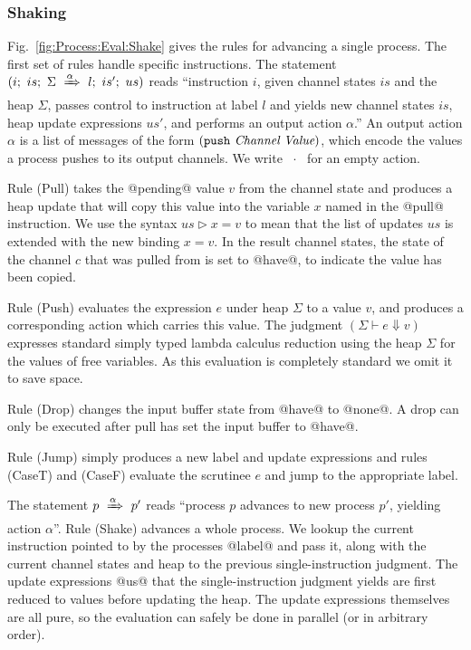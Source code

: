 



\subsubsection{Shaking}
Fig.~\ref{fig:Process:Eval:Shake} gives the rules for advancing a single process. The first set of rules handle specific instructions. The statement $(i;~is;~\Sigma~\xRightarrow{\alpha}~l;~is';~us)$ reads ``instruction $i$, given channel states $is$ and the heap $\Sigma$, passes control to instruction at label $l$ and yields new channel states $is$, heap update expressions $us'$, and performs an output action $\alpha$.'' An output action $\alpha$ is a list of messages of the form $(\texttt{push}~\textit{Channel}~\textit{Value})$, which encode the values a process pushes to its output channels. We write ~$\cdot$~ for an empty action. 

\eject{}
Rule (Pull) takes the @pending@ value $v$ from the channel state and produces a heap update that will copy this value into the variable $x$ named in the @pull@ instruction. We use the syntax $us \rhd x=v$ to mean that the list of updates $us$ is extended with the new binding $x=v$. In the result channel states, the state of the channel $c$ that was pulled from is set to @have@, to indicate the value has been copied.

Rule (Push) evaluates the expression $e$ under heap $\Sigma$ to a value $v$, and produces a corresponding action which carries this value. The judgment $(\Sigma \vdash e \Downarrow v)$ expresses standard simply typed lambda calculus reduction using the heap $\Sigma$ for the values of free variables. As this evaluation is completely standard we omit it to save space.

Rule (Drop) changes the input buffer state from @have@ to @none@. A drop can only be executed after pull has set the input buffer to @have@. 

Rule (Jump) simply produces a new label and update expressions and rules (CaseT) and (CaseF) evaluate the scrutinee $e$ and jump to the appropriate label.

The statement $p~\xRightarrow{\alpha}~p'$ reads ``process $p$ advances to new process $p'$, yielding action $\alpha$''. Rule (Shake) advances a whole process. We lookup the current instruction pointed to by the processes @label@ and pass it, along with the current channel states and heap to the previous single-instruction judgment. The update expressions @us@ that the single-instruction judgment yields are first reduced to values before updating the heap. The update expressions themselves are all pure, so the evaluation can safely be done in parallel (or in arbitrary order).


